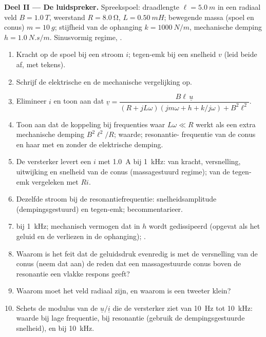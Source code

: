 \begin{problem}
\medskip
\noindent\textbf{Deel II --- De luidspreker.}
Spreekspoel: draadlengte $\ell = \qty{5.0}{m}$ in een radiaal veld $B =
\qty{1.0}{T}$, weerstand $R = \qty{8.0}{\ohm}$,  $L = \qty{0.50}{mH}$;
bewegende massa (spoel en conus) $m = \qty{10}{g}$; stijfheid van de ophanging
$k = \qty{1000}{N/m}$, mechanische demping $h = \qty{1.0}{N.s/m}$. Sinusvormig
regime, .
\begin{enumerate}[resume]
  \item Kracht op de spoel bij een stroom $i$; tegen-emk bij een snelheid $v$
        (leid beide af, met tekens).
  \item Schrijf de elektrische en de mechanische vergelijking op.
  \item Elimineer $i$ en toon aan dat
        $\underline v = \dfrac{B\ell\,\underline u}{(R + jL\omega)(jm\omega + h + k/j\omega) + B^2\ell^2}$.
  \item Toon aan dat de koppeling bij frequenties waar $L\omega \ll R$ werkt
        als een extra mechanische demping $B^2\ell^2/R$; waarde; resonantie-
        frequentie van de conus en haar  met en zonder
        de elektrische demping.
  \item De versterker levert een $i$ met  \qty{1.0}{A} bij \qty{1}{kHz}:
         van kracht, versnelling, uitwijking en snelheid van de
        conus (massagestuurd regime);  van de tegen-emk vergeleken met
        $Ri$.
  \item Dezelfde stroom bij de resonantiefrequentie: snelheidsamplitude
        (dempingsgestuurd) en tegen-emk; becommentarieer.
  \item {} bij \qty{1}{kHz}; mechanisch vermogen dat in
        $h$ wordt gedissipeerd (opgevat als het geluid en de verliezen in de ophanging); .
  \item Waarom is het feit dat de geluidsdruk evenredig is met de versnelling van
        de conus (neem dat aan) de reden dat een massagestuurde conus boven de
        resonantie een vlakke respons geeft?
  \item Waarom moet het veld radiaal zijn, en waarom is een tweeter klein?
  \item Schets de modulus van de  $\underline u/\underline i$ die de
        versterker ziet van \qty{10}{Hz} tot \qty{10}{kHz}: waarde bij lage
        frequentie, bij resonantie (gebruik de dempingsgestuurde snelheid),
        en bij \qty{10}{kHz}.
\end{enumerate}


\end{problem}
